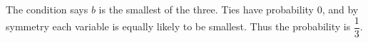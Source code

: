 The condition says $ b $ is the smallest of the three. Ties have probability 0, and by symmetry each variable is equally likely to be smallest. Thus the probability is $\boxed{\dfrac{1}{3}}$.
